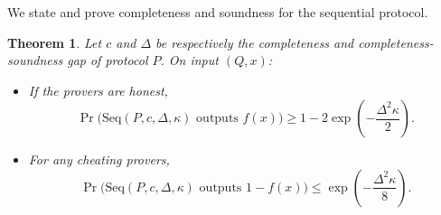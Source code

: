 \documentclass[11pt]{article}
\numberwithin{equation}{section}
\newtheorem{theorem}{Theorem}[section]
\theoremstyle{definition}
\theoremstyle{plain}
\begin{document}
\noindent We state and prove completeness and soundness for the sequential protocol.

\begin{theorem}
  Let $c$ and $\Delta$ be respectively %
%
the completeness and completeness-soundness gap
of %
protocol $P$.
On input $(Q,x)$:
\begin{itemize}
\item If the provers are honest, $$ \Pr\big(\mbox{Seq}(P, c, \Delta, \kappa) \mbox{  outputs } f(x)\big) \geq 1 - 2\exp \left(-\frac{\Delta^2\kappa}{2}\right) .$$ 
\item For any cheating provers, $$\Pr\big(\mbox{Seq}(P, c, \Delta, \kappa) \mbox{  outputs } 1-f(x)\big) \leq \exp \left(-\frac{\Delta^2\kappa}{8}\right) .$$
\end{itemize}

\end{theorem}
\end{document}
